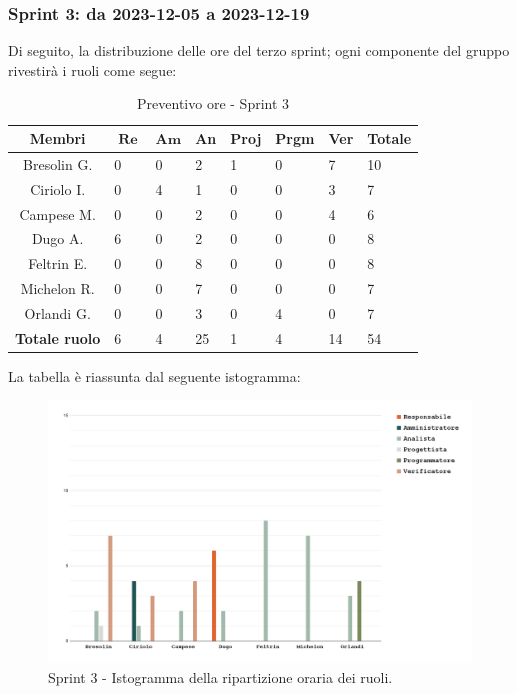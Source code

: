 \documentclass[10pt, a4paper]{article}
\begin{document}
\subsubsection{Sprint 3: da 2023-12-05 a 2023-12-19}
Di seguito, la distribuzione delle ore del terzo sprint; ogni componente del gruppo rivestirà i ruoli come segue:
\begin{table}[H]
\begin{tabularx}{\textwidth}{c|X|X|X|X|X|X|X}
        \textbf{Membri} & $\operatorname{\textbf{Re}}$ & $\mathrm{\textbf{Am}}$ & \textbf{An} & \textbf{Proj} & \textbf{Prgm} & \textbf{Ver} & \textbf{Totale} \\
        \hline Bresolin G. & 0 & 0 & 2 & 1 & 0 & \cellcolor{primarycolor}7 & 10 \\
        \hline Ciriolo I.  & 0 & \cellcolor{primarycolor}4 & 1 & 0 & 0 & 3 & 7 \\
        \hline Campese M.  & 0 & 0 & \cellcolor{primarycolor}2 & 0 & 0 & 4 & 6 \\
        \hline Dugo A.     & \cellcolor{primarycolor}6 & 0 & 2 & 0 & 0 & 0 & 8 \\
        \hline Feltrin E.  & 0 & 0 & \cellcolor{primarycolor}8 & 0 & 0 & 0 & 8 \\
        \hline Michelon R. & 0 & 0 & \cellcolor{primarycolor}7 & 0 & 0 & 0 & 7 \\
        \hline Orlandi G.  & 0 & 0 & 3 & 0 & \cellcolor{primarycolor}4 & 0 & 7 \\
        \hline
        \textbf{Totale ruolo} & 6 & 4 & 25 & 1 & 4 & 14 & 54 
    \end{tabularx}
    \caption{Preventivo ore - Sprint 3}
    \end{table}

La tabella è riassunta dal seguente istogramma:
 \begin{figure}[H]
        \centering        
        \includegraphics[width=15.5cm]{istogrammi/istogramma_3_periodo.png}
        \caption{Sprint 3 - Istogramma della ripartizione oraria dei ruoli. }
    \end{figure}
\end{document}
